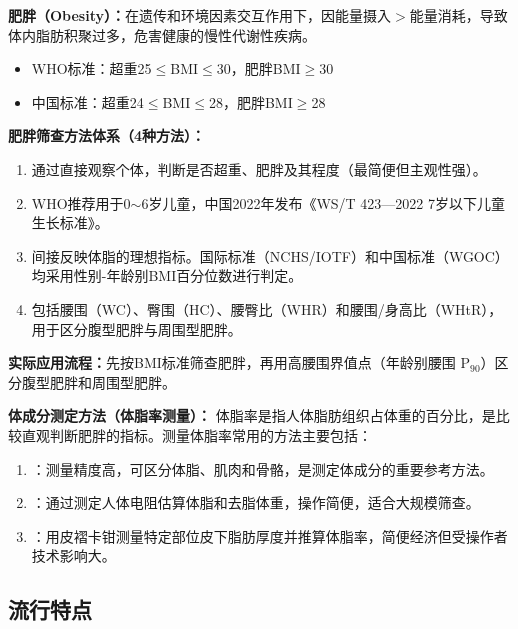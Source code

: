 \begin{defbox}
\textbf{肥胖（Obesity）：}在遗传和环境因素交互作用下，因能量摄入$>$能量消耗，导致体内脂肪积聚过多，危害健康的慢性代谢性疾病。

\begin{itemize}[leftmargin=*]
    \item WHO标准：超重25$\leq$BMI$\leq$30，肥胖BMI$\geq$30
    \item 中国标准：超重24$\leq$BMI$\leq$28，肥胖BMI$\geq$28
\end{itemize}

\vspace{4pt}
\textbf{肥胖筛查方法体系（4种方法）：}
\begin{enumerate}[leftmargin=*]
    \item {}通过直接观察个体，判断是否超重、肥胖及其程度（最简便但主观性强）。
    \item {}WHO推荐用于0$\sim$6岁儿童，中国2022年发布《WS/T 423—2022 7岁以下儿童生长标准》。
    \item {}间接反映体脂的理想指标。国际标准（NCHS/IOTF）和中国标准（WGOC）均采用性别-年龄别BMI百分位数进行判定。
    \item {}包括腰围（WC）、臀围（HC）、腰臀比（WHR）和腰围/身高比（WHtR），用于区分腹型肥胖与周围型肥胖。
\end{enumerate}

\textbf{实际应用流程：}先按BMI标准筛查肥胖，再用高腰围界值点（年龄别腰围 P$_{90}$）区分腹型肥胖和周围型肥胖。

\vspace{4pt}
\textbf{体成分测定方法（体脂率测量）：}
体脂率是指人体脂肪组织占体重的百分比，是比较直观判断肥胖的指标。测量体脂率常用的方法主要包括：
\begin{enumerate}[leftmargin=*]
    \item {}：测量精度高，可区分体脂、肌肉和骨骼，是测定体成分的重要参考方法。
    \item {}：通过测定人体电阻估算体脂和去脂体重，操作简便，适合大规模筛查。
    \item {}：用皮褶卡钳测量特定部位皮下脂肪厚度并推算体脂率，简便经济但受操作者技术影响大。
\end{enumerate}
\end{defbox}

\subsection{流行特点}

